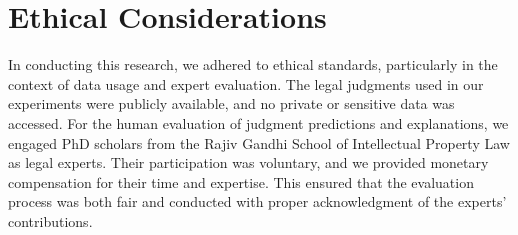 \section*{Ethical Considerations}

In conducting this research, we adhered to ethical standards, particularly in the context of data usage and expert evaluation. The legal judgments used in our experiments were publicly available, and no private or sensitive data was accessed. For the human evaluation of judgment predictions and explanations, we engaged PhD scholars from the Rajiv Gandhi School of Intellectual Property Law as legal experts. Their participation was voluntary, and we provided monetary compensation for their time and expertise. This ensured that the evaluation process was both fair and conducted with proper acknowledgment of the experts' contributions.
